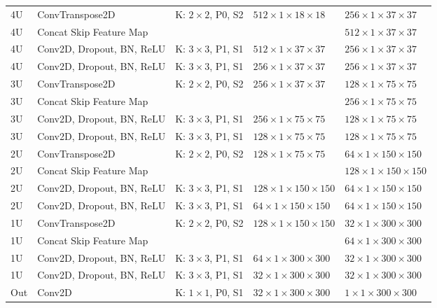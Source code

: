 \begin{sidewaystable}[htbp]
\begin{tabular}{l*{4}{l}}
      4U	& ConvTranspose2D			& K: $2 \times 2$, P0, S2		& $512 \times 1 \times 18 \times 18$	& $256 \times 1 \times 37 \times 37$	\\
      4U	& Concat Skip Feature Map	&								&										& $512 \times 1 \times 37 \times 37$	\\
      4U	& Conv2D, Dropout, BN, ReLU & K: $3 \times 3$, P1, S1		& $512 \times 1 \times 37 \times 37$	& $256 \times 1 \times 37 \times 37$	\\
      4U	& Conv2D, Dropout, BN, ReLU & K: $3 \times 3$, P1, S1		& $256 \times 1 \times 37 \times 37$	& $256 \times 1 \times 37 \times 37$	\\
      3U	& ConvTranspose2D			& K: $2 \times 2$, P0, S2		& $256 \times 1 \times 37 \times 37$	& $128 \times 1 \times 75 \times 75$	\\
      3U	& Concat Skip Feature Map	&								&										& $256 \times 1 \times 75 \times 75$	\\
      3U	& Conv2D, Dropout, BN, ReLU & K: $3 \times 3$, P1, S1		& $256 \times 1 \times 75 \times 75$	& $128 \times 1 \times 75 \times 75$	\\
      3U	& Conv2D, Dropout, BN, ReLU & K: $3 \times 3$, P1, S1		& $128 \times 1 \times 75 \times 75$	& $128 \times 1 \times 75 \times 75$	\\
      2U	& ConvTranspose2D			& K: $2 \times 2$, P0, S2		& $128 \times 1 \times 75 \times 75$	& $64 \times 1 \times 150 \times 150$	\\
      2U	& Concat Skip Feature Map	&								&										& $128 \times 1 \times 150 \times 150$	\\
      2U	& Conv2D, Dropout, BN, ReLU & K: $3 \times 3$, P1, S1		& $128 \times 1 \times 150 \times 150$	& $64 \times 1 \times 150 \times 150$	\\
      2U	& Conv2D, Dropout, BN, ReLU & K: $3 \times 3$, P1, S1		& $64 \times 1 \times 150 \times 150$	& $64 \times 1 \times 150 \times 150$	\\
      1U	& ConvTranspose2D			& K: $2 \times 2$, P0, S2		& $128 \times 1 \times 150 \times 150$	& $32 \times 1 \times 300 \times 300$	\\
      1U	& Concat Skip Feature Map	&								&										& $64 \times 1 \times 300 \times 300$	\\
      1U	& Conv2D, Dropout, BN, ReLU & K: $3 \times 3$, P1, S1		& $64 \times 1 \times 300 \times 300$	& $32 \times 1 \times 300 \times 300$	\\
      1U	& Conv2D, Dropout, BN, ReLU & K: $3 \times 3$, P1, S1		& $32 \times 1 \times 300 \times 300$	& $32 \times 1 \times 300 \times 300$	\\
      
      Out	& Conv2D					& K: $1 \times 1$, P0, S1		& $32 \times 1 \times 300 \times 300$	& $1 \times 1 \times 300 \times 300$	\\
      \bottomrule
   \end{tabular}
   \label{tab:architecture_fcnn_base}
\end{sidewaystable}

